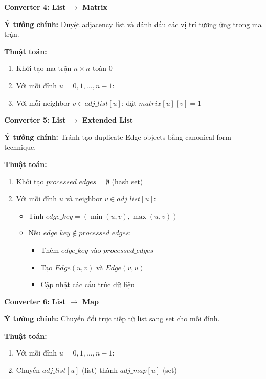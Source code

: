 \documentclass[12pt,a4paper]{article}
\begin{document}
\textbf{Converter 4: List $\rightarrow$ Matrix}

\textbf{Ý tưởng chính:} Duyệt adjacency list và đánh dấu các vị trí tương ứng trong ma trận.

\textbf{Thuật toán:}
\begin{enumerate}
    \item Khởi tạo ma trận $n \times n$ toàn $0$
    \item Với mỗi đỉnh $u = 0, 1, \ldots, n-1$:
    \item Với mỗi neighbor $v \in adj\_list[u]$: đặt $matrix[u][v] = 1$
\end{enumerate}
\vspace{0.5cm}

\textbf{Converter 5: List $\rightarrow$ Extended List}

\textbf{Ý tưởng chính:} Tránh tạo duplicate Edge objects bằng canonical form technique.

\textbf{Thuật toán:}
\begin{enumerate}
    \item Khởi tạo $processed\_edges = \emptyset$ (hash set)
    \item Với mỗi đỉnh $u$ và neighbor $v \in adj\_list[u]$:
    \begin{itemize}
        \item Tính $edge\_key = (\min(u,v), \max(u,v))$
        \item Nếu $edge\_key \notin processed\_edges$:
        \begin{itemize}
            \item Thêm $edge\_key$ vào $processed\_edges$
            \item Tạo $Edge(u,v)$ và $Edge(v,u)$
            \item Cập nhật các cấu trúc dữ liệu
        \end{itemize}
    \end{itemize}
\end{enumerate}
\vspace{0.5cm}

\textbf{Converter 6: List $\rightarrow$ Map}

\textbf{Ý tưởng chính:} Chuyển đổi trực tiếp từ list sang set cho mỗi đỉnh.

\textbf{Thuật toán:}
\begin{enumerate}
    \item Với mỗi đỉnh $u = 0, 1, \ldots, n-1$:
    \item Chuyển $adj\_list[u]$ (list) thành $adj\_map[u]$ (set)
\end{enumerate}
\vspace{0.5cm}
\end{document}
